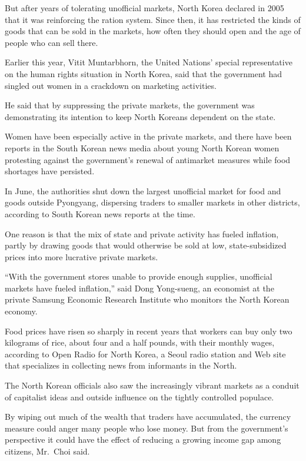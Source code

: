 ﻿\documentclass[12pt]{article}
\begin{document}
But after years of tolerating unofficial markets, North Korea declared in 2005 that it was
reinforcing the ration system. Since then, it has restricted the kinds of goods that can be sold in
the markets, how often they should open and the age of people who can sell there.

Earlier this year, Vitit Muntarbhorn, the United Nations' special representative on the human rights
situation in North Korea, said that the government had singled out women in a crackdown on marketing
activities.

He said that by suppressing the private markets, the government was demonstrating its intention to
keep North Koreans dependent on the state.

Women have been especially active in the private markets, and there have been reports in the South
Korean news media about young North Korean women protesting against the government's renewal of
antimarket measures while food shortages have persisted.

In June, the authorities shut down the largest unofficial market for food and goods outside
Pyongyang, dispersing traders to smaller markets in other districts, according to South Korean news
reports at the time.

One reason is that the mix of state and private activity has fueled inflation, partly by drawing
goods that would otherwise be sold at low, state-subsidized prices into more lucrative private
markets.

``With the government stores unable to provide enough supplies, unofficial markets have fueled
inflation,'' said Dong Yong-sueng, an economist at the private Samsung Economic Research Institute
who monitors the North Korean economy.

Food prices have risen so sharply in recent years that workers can buy only two kilograms of rice,
about four and a half pounds, with their monthly wages, according to Open Radio for North Korea, a
Seoul radio station and Web site that specializes in collecting news from informants in the North.

The North Korean officials also saw the increasingly vibrant markets as a conduit of capitalist
ideas and outside influence on the tightly controlled populace.

By wiping out much of the wealth that traders have accumulated, the currency measure could anger
many people who lose money. But from the government's perspective it could have the effect of
reducing a growing income gap among citizens, Mr.~Choi said.
\end{document}
